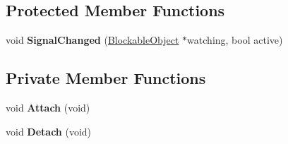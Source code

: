 \subsection*{Protected Member Functions}
\begin{DoxyCompactItemize}
\item 
\mbox{\label{class_thread_a618ade00afca159e852bd616ac0b922e}} 
void {\bfseries Signal\+Changed} (\hyperlink{class_blockable_object}{Blockable\+Object} $\ast$watching, bool active)
\end{DoxyCompactItemize}
\subsection*{Private Member Functions}
\begin{DoxyCompactItemize}
\item 
\mbox{\label{class_thread_adcf312c7e08e0aba6f23919c80eb36b6}} 
void {\bfseries Attach} (void)
\item 
\mbox{\label{class_thread_a38e34beffce9709c0e0e5d2104885133}} 
void {\bfseries Detach} (void)
\end{DoxyCompactItemize}
